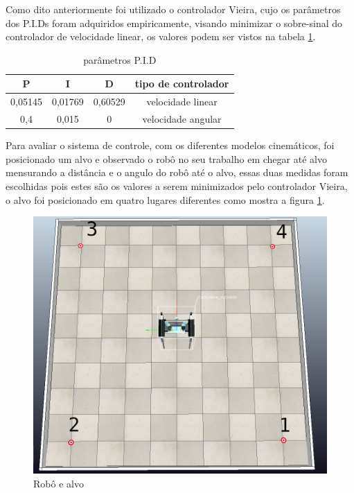 Como dito anteriormente foi utilizado o controlador Vieira,
cujo os parâmetros dos P.I.Ds foram adquiridos empiricamente,
visando minimizar o sobre-sinal do controlador de velocidade linear,
os valores podem ser vistos na tabela \ref{table:pid:}.

\begin{table}[H]
    \label{table:pid:}
    \centering
    \begin{tabular}{c|c|c|c}
        \hline
        P & I & D & tipo de controlador \\
        \hline
        0,05145 & 0,01769 & 0,60529 & velocidade linear \\
        \hline
        0,4 & 0,015 & 0 & velocidade angular \\
        \hline
    \end{tabular}
    \caption{parâmetros P.I.D}
\end{table}

Para avaliar o sistema de controle, com os diferentes modelos
cinemáticos, foi posicionado um alvo e observado o robô no seu
trabalho em chegar até alvo mensurando a distância e o angulo do robô até
o alvo, essas duas medidas foram escolhidas pois 
estes são os valores a serem minimizados pelo controlador Vieira,
o alvo foi posicionado em quatro lugares diferentes como mostra a figura
\ref{fig:robo:e:4:alvos}.

\begin{figure}[H]
    \label{fig:robo:e:4:alvos}
    \centering
    \includegraphics[scale=0.3]{figuras/robo_e_alvo.png}
    \caption{Robô e alvo}
\end{figure}

